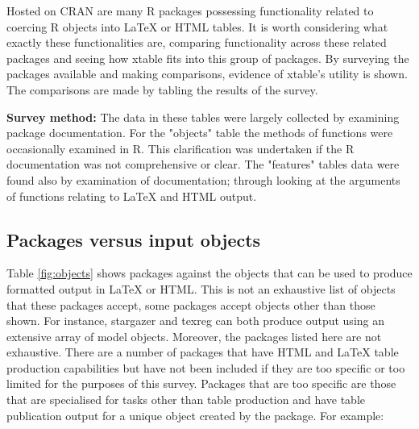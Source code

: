 \documentclass{memoir}\usepackage[]{graphicx}\usepackage[]{color}
\newcommand{\pkg}[1]{{\fontseries{b}\selectfont #1}}
\newcommand{\latex}{\LaTeX\xspace}
\begin{document}
Hosted on CRAN are many R packages possessing functionality related to coercing R objects into \latex or HTML tables. It is worth considering what exactly these functionalities are, comparing functionality across these related packages and seeing how \pkg{xtable} fits into this group of packages. By surveying the packages available and making comparisons, evidence of \pkg{xtable}'s utility is shown. The comparisons are made by tabling the results of the survey.

\vspace{4mm}

\textbf{Survey method:}
The data in these tables were largely collected by examining package documentation. For the "objects" table the methods of functions were occasionally examined in R. This clarification was undertaken if the R documentation was not comprehensive or clear. The "features" tables data were found also by examination of documentation; through looking at the arguments of functions relating to \latex and HTML output.

\vspace{10 pt}

\subsection{Packages versus input objects}

Table \ref{fig:objects} shows packages against the objects that can be used to produce formatted output in \latex or HTML. This is not an exhaustive list of objects that these packages accept, some packages accept objects other than those shown. For instance, \pkg{stargazer}\cite{stargazer} and \pkg{texreg}\cite{texreg} can both produce output using an extensive array of model objects. Moreover, the packages listed here are not exhaustive. There are a number of packages that have HTML and \latex table production capabilities but have not been included if they are too specific or too limited for the purposes of this survey. Packages that are too specific are those that are specialised for tasks other than table production and have table publication output for a unique object created by the package. For example:
\end{document}
